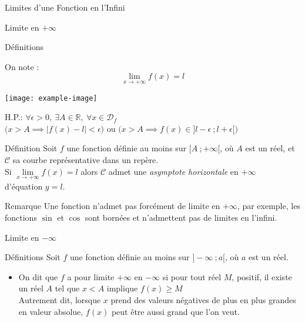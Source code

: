 \documentclass{cours}
\begin{document}
\begin{Gpartie}{Limites d'une Fonction en l'Infini}
\begin{Spartie}{Limite en $+\infty$}
\begin{SSpartie}{Définitions}
\begin{itemize}
                    On note : \[\lim\limits_{x\to +\infty}f(x)=l\]
                    \begin{center}
                            \texttt{[image: example-image]}
                        \parbox{\linewidth}{}
                    \end{center}
                    \vspace*{2ex}
                    H.P.: $\forall\epsilon >0,~\exists A\in\mathbb{R},~\forall x\in\mathcal{D}_f$ \\ \phantom{H.P.: }$\bigg(x>A\implies\left\lvert f(x)-l\right\rvert <\epsilon\bigg)$ ou $\bigg(x>A\implies f(x)\in\big]l-\epsilon~;l+\epsilon\big[\bigg)$
                \end{itemize}
            \end{SSpartie}
            \begin{SSpartie}{Définition} 
                Soit $f$ une fonction définie au moins sur $\big[A~;+\infty\big[$, où $A$ est un réel, et $\mathcal{C}$ sa courbe représentative dans un repère. \\ Si $\lim\limits_{x\to+\infty}f(x)=l$ alors $\mathcal{C}$ admet une \emph{asymptote horizontale} en $+\infty$ \\ d'équation $y=l$.
            \end{SSpartie}
            \begin{SSpartie}{Remarque} 
                Une fonction n'admet pas forcément de limite en $+\infty$, par exemple, les fonctions $\sin$ et $\cos$ sont bornées et n'admettent pas de limites en l'infini.
            \end{SSpartie}
        \end{Spartie}
        \begin{Spartie}{Limite en $-\infty$} 
            \begin{SSpartie}{Définitions}
                Soit $f$ une fonction définie au moins sur $\big]-\infty~;a\big[$, où $a$ est un réel.
                \begin{itemize}
                    \item   On dit que $f$ a pour limite $+\infty$ en $-\infty$ si pour tout réel $M$, positif, il existe un réel $A$ tel que $x<A$ implique $f(x)\geq M$ \\ Autrement dit, lorsque $x$ prend des valeurs négatives de plus en plus grandes en valeur absolue, $f(x)$ peut être aussi grand que l'on veut.
                    

\end{itemize}
\end{SSpartie}
\end{Spartie}
\end{Gpartie}
\end{document}
